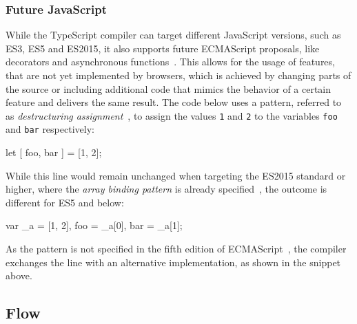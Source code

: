 
\subsubsection{Future JavaScript}
\label{sec:ts-future-javascript}

While the TypeScript compiler can target different JavaScript versions, such as ES3, ES5 and ES2015, it also supports future ECMAScript proposals, like decorators and asynchronous functions~\cites{TypeScriptHandbook:CompilerOptions, TypeScriptWebsite}. This allows for the usage of features, that are not yet implemented by browsers, which is achieved by changing parts of the source or including additional code that mimics the behavior of a certain feature and delivers the same result. The code below uses a pattern, referred to as \emph{destructuring assignment}~\cite{DestructuringAssignment:Mozilla:2015}, to assign the values \texttt{1} and \texttt{2} to the variables \texttt{foo} and \texttt{bar} respectively:
\begin{JsCode}[numbers=none]
let [ foo, bar ] = [1, 2];  
\end{JsCode}
While this line would remain unchanged when targeting the ES2015 standard or higher, where the \emph{array binding pattern} is already specified~\cite[p.~198]{ES6Spec:Ecma:2015}, the outcome is different for ES5 and below:
\begin{JsCode}[numbers=none]
var _a = [1, 2], foo = _a[0], bar = _a[1];
\end{JsCode}
As the pattern is not specified in the fifth edition of ECMAScript~\cite{ES5Spec:Ecma:2015}, the compiler exchanges the line with an alternative implementation, as shown in the snippet above.
 
\subsection{Flow}
\label{sec:flow}

